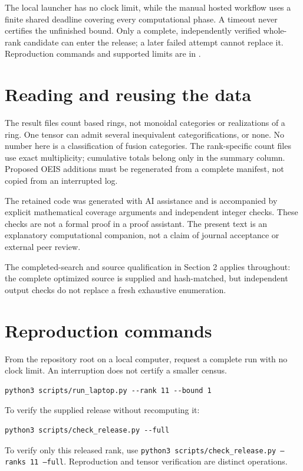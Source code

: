 \documentclass[11pt,a4paper]{article}
\theoremstyle{definition}\newtheorem{definition}[theorem]{Definition}\newtheorem{remark}[theorem]{Remark}
\begin{document}
The local launcher has no clock limit, while the manual hosted workflow uses a
finite shared deadline covering every computational phase. A timeout never
certifies the unfinished bound. Only a complete, independently verified whole-rank
candidate can enter the release; a later failed attempt cannot replace it.
Reproduction commands and supported limits are in .

\section{Reading and reusing the data}
The result files count based rings, not monoidal categories or realizations of
a ring. One tensor can admit several inequivalent categorifications, or none.
No number here is a classification of fusion categories. The rank-specific
count files use exact multiplicity; cumulative totals belong only in the
summary column. Proposed OEIS additions must be regenerated from a complete
manifest, not copied from an interrupted log.

The retained code was generated with AI assistance and is accompanied by explicit
mathematical coverage arguments and independent integer checks. These checks
are not a formal proof in a proof assistant. The present text is an explanatory
computational companion, not a claim of journal acceptance or external peer review.

The completed-search and source qualification in Section 2 applies throughout: the complete optimized source is supplied and hash-matched, but independent output checks do not replace a fresh exhaustive enumeration.

\par\noindent\begin{minipage}{\linewidth}
\section{Reproduction commands}
From the repository root on a local computer, request a complete run with no clock limit. An interruption does not certify a smaller census.
\par\noindent\begin{minipage}{\linewidth}
\begin{lstlisting}
python3 scripts/run_laptop.py --rank 11 --bound 1
\end{lstlisting}
\end{minipage}\par
To verify the supplied release without recomputing it:
\par\noindent\begin{minipage}{\linewidth}
\begin{lstlisting}
python3 scripts/check_release.py --full
\end{lstlisting}
\end{minipage}\par
To verify only this released rank, use \texttt{python3 scripts/check\_release.py --ranks 11 --full}. Reproduction and tensor verification are distinct operations.

\end{minipage}\par
\end{document}
